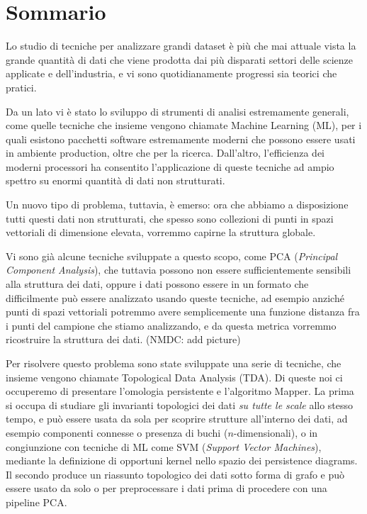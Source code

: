 \begingroup
\let\clearpage\relax
\let\cleardoublepage\relax
\let\cleardoublepage\relax

\chapter*{Sommario}

Lo studio di tecniche per analizzare grandi dataset è più che mai attuale vista la grande quantità di dati che viene prodotta dai più disparati settori delle scienze applicate e dell'industria, e vi sono quotidianamente progressi sia teorici che pratici.

Da un lato vi è stato lo sviluppo di strumenti di analisi estremamente generali, come quelle tecniche che insieme vengono chiamate Machine Learning (ML), per i quali esistono pacchetti software estremamente moderni che possono essere usati in ambiente production, oltre che per la ricerca. Dall'altro, l'efficienza dei moderni processori ha consentito l'applicazione di queste tecniche ad ampio spettro su enormi quantità di dati non strutturati.

Un nuovo tipo di problema, tuttavia, è emerso: ora che abbiamo a disposizione tutti questi dati non strutturati, che spesso sono collezioni di punti in spazi vettoriali di dimensione elevata, vorremmo capirne la struttura globale.

Vi sono già alcune tecniche sviluppate a questo scopo, come PCA (\emph{Principal Component Analysis}), che tuttavia possono non essere sufficientemente sensibili alla struttura dei dati, oppure i dati possono essere in un formato che difficilmente può essere analizzato usando queste tecniche, ad esempio anziché punti di spazi vettoriali potremmo avere semplicemente una funzione distanza fra i punti del campione che stiamo analizzando, e da questa metrica vorremmo ricostruire la struttura dei dati. (NMDC: add picture)

Per risolvere questo problema sono state sviluppate una serie di tecniche, che insieme vengono chiamate Topological Data Analysis (TDA). Di queste noi ci occuperemo di presentare l'omologia persistente e l'algoritmo Mapper. La prima si occupa di studiare gli invarianti topologici dei dati \emph{su tutte le scale} allo stesso tempo, e può essere usata da sola per scoprire strutture all'interno dei dati, ad esempio componenti connesse o presenza di buchi ($n$-dimensionali), o in congiunzione con tecniche di ML come SVM (\emph{Support Vector Machines}), mediante la definizione di opportuni kernel nello spazio dei persistence diagrams. Il secondo produce un riassunto topologico dei dati sotto forma di grafo e può essere usato da solo o per preprocessare i dati prima di procedere con una pipeline PCA.

\vfill

\endgroup

\vfill
